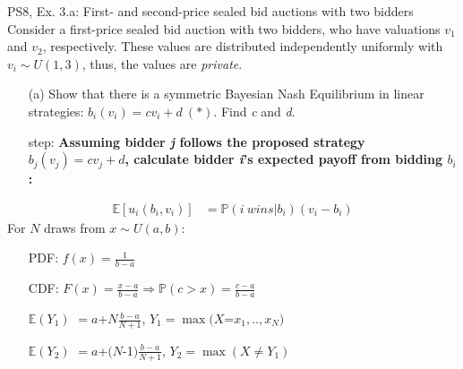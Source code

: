 \begin{frame}{PS8, Ex. 3.a: First- and second-price sealed bid auctions with two bidders}
    Consider a first-price sealed bid auction with two bidders, who have valuations $v_1$ and $v_2$, respectively. These values are distributed independently uniformly with $v_i\sim U(1,3)$, thus, the values are \textit{private}.
    \vspace{-4pt}
    \begin{itemize}
      \item[(a)] Show that there is a symmetric Bayesian Nash Equilibrium in linear strategies: $b_i(v_i) = cv_i + d\ (*)$. Find \textit{c} and \textit{d}.
    \end{itemize}
    \vspace{-8pt}
    \begin{multicols}{2}
      \begin{itemize}
        \item[\nth{1} step:] \textbf{Assuming bidder \textit{j} follows the proposed strategy $b_j(v_j) = cv_j + d$, calculate bidder \textit{i}'s expected payoff from bidding $b_i$:}
      \end{itemize}
      \vspace{-4pt}
      \begin{align*}
        \mathbb{E}[u_i(b_i,v_i)]&=\mathbb{P}(i\ wins|b_i)(v_i-b_i)
      \end{align*}
      \vfill\null\columnbreak
      For $N$ draws from $x\sim U(a, b):$
      \vspace{-6pt}
      \begin{enumerate}
        \item[PDF:] $f(x)=\frac{1}{b-a}$
        \item[CDF:] $F(x)=\frac{x-a}{b-a}\Rightarrow\mathbb{P}(c>x)=\frac{c-a}{b-a}$
        \item[$\mathbb{E}(Y_1)$] $=a$+$N\frac{b-a}{N+1}$, $Y_1=\max(X$=$x_1,..,x_N)$
        \item[$\mathbb{E}(Y_2)$] $=a$+$(N$-1$)\frac{b-a}{N+1}$, $Y_2=\max(X\neq Y_1)$
      \end{enumerate}
      \vfill\null
    \end{multicols}
\end{frame}
